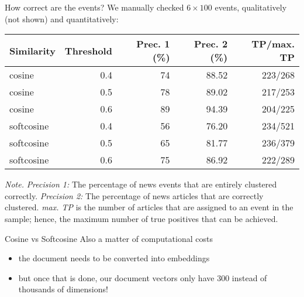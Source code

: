 \begin{frame}[fragile]{How correct are the events?}
  We manually checked $6 \times 100$ events, qualitatively (not shown) and quantitatively:
  \begin{table}
    \begin{tabular}{lrrrr}
      \footnotesize
      \textbf{Similarity}   & \textbf{Threshold} & \textbf{Prec. 1 (\%)} & \textbf{Prec. 2 (\%)} &\textbf{TP/max. TP}  \\
      \midrule
      cosine              & 0.4       & 74        & 88.52     & 223/268 \\
      cosine              & 0.5       & 78        & 89.02     & 217/253 \\
      cosine              & 0.6       & 89        & 94.39     & 204/225 \\
      softcosine          & 0.4       & 56        & 76.20     & 234/521 \\
      softcosine          & 0.5       & 65        & 81.77     & 236/379 \\
      softcosine          & 0.6       & 75        & 86.92     & 222/289 \\
      
    \end{tabular}
	\end{table}
	\tiny 
	\textit{Note.} \textit{Precision 1:} The percentage of news events that are entirely clustered correctly. \textit{Precision 2:} The percentage of news articles that are correctly clustered. \textit{max. TP} is the number of articles that are assigned to an event in the sample; hence, the maximum number of true positives that can be achieved.\\
	
\end{frame}

\begin{frame}{Cosine vs Softcosine}
	Also a matter of computational costs
	\begin{itemize}
	\item the document needs to be converted into embeddings
	\item but once that is done, our document vectors only have 300 instead of thousands of dimensions!
	\end{itemize}
\end{frame}

